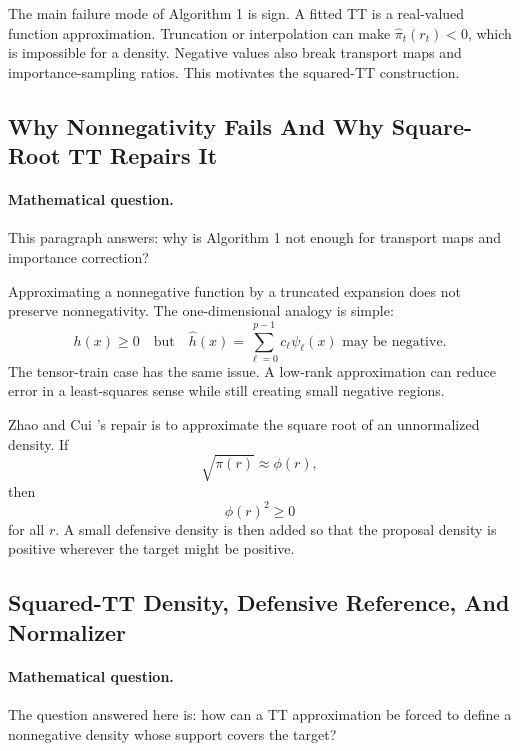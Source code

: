 \documentclass[11pt]{article}
\numberwithin{equation}{section}
\begin{document}
The main failure mode of Algorithm 1 is sign.  A fitted TT is a real-valued
function approximation.  Truncation or interpolation can make
\(\widehat\pi_t(r_t)<0\), which is impossible for a density.  Negative values
also break transport maps and importance-sampling ratios.  This motivates the
squared-TT construction.

\subsection{Why Nonnegativity Fails And Why Square-Root TT Repairs It}

\paragraph{Mathematical question.}
This paragraph answers: why is Algorithm 1 not enough for transport maps and
importance correction?

Approximating a nonnegative function by a truncated expansion does not preserve
nonnegativity.  The one-dimensional analogy is simple:
\[
    h(x)\ge 0
    \quad\text{but}\quad
    \widehat h(x)=\sum_{\ell=0}^{p-1}c_\ell\psi_\ell(x)
    \text{ may be negative.}
\]
The tensor-train case has the same issue.  A low-rank approximation can reduce
error in a least-squares sense while still creating small negative regions.

Zhao and Cui \cite{zhao2024ttsequential}'s repair is to approximate the square root of an unnormalized density.
If
\[
    \sqrt{\pi(r)}\approx \phi(r),
\]
then
\[
    \phi(r)^2\ge 0
\]
for all \(r\).  A small defensive density is then added so that the proposal
density is positive wherever the target might be positive.

\subsection{Squared-TT Density, Defensive Reference, And Normalizer}

\paragraph{Mathematical question.}
The question answered here is: how can a TT approximation be forced to define a
nonnegative density whose support covers the target?
\end{document}
